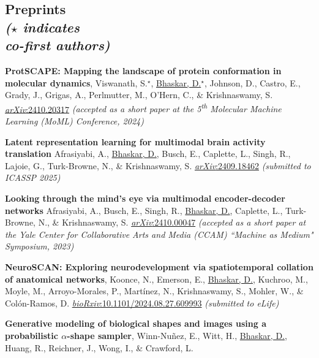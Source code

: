 \documentclass[margin,line]{res}
\begin{document}
\begin{resume}
\section{\sc Preprints\\ \textit{{\small ($\star$ indicates \\ co-first authors)}}}
{
\renewcommand\leftmargini{0em}
\renewcommand{\labelenumi}{P\theenumi}
\begin{etaremune}[start=8]
\item{\bf ProtSCAPE: Mapping the landscape of protein conformation in molecular dynamics},
Viswanath, S.$^\star$, \underline{Bhaskar, D.}$^\star$, Johnson, D., Castro, E., Grady, J., Grigas, A., Perlmutter, M., O'Hern, C., \& Krishnaswamy, S.
\href{https://arxiv.org/abs/2410.20317v1}{\textit{arXiv}:2410.20317}
\textit{(accepted as a short paper at the 5\textsuperscript{th} Molecular Machine Learning (MoML) Conference, 2024)}
\vspace*{.1cm}
\item{\bf Latent representation learning for multimodal brain activity translation}
Afrasiyabi, A., \underline{Bhaskar, D.}, Busch, E., Caplette, L., Singh, R., Lajoie, G., Turk-Browne, N., \& Krishnaswamy, S.
\href{https://arxiv.org/abs/2409.18462}{\textit{arXiv}:2409.18462}
\textit{(submitted to ICASSP 2025)}
\vspace*{.1cm}
\item{\bf Looking through the mind's eye via multimodal encoder-decoder networks}
Afrasiyabi, A., Busch, E., Singh, R., \underline{Bhaskar, D.}, Caplette, L., Turk-Browne, N., \& Krishnaswamy, S.
\href{https://arxiv.org/abs/2410.00047}{\textit{arXiv}:2410.00047} 
\textit{(accepted as a short paper at the Yale Center for Collaborative Arts and Media (CCAM) ``Machine as Medium" Symposium, 2023)}
\vspace*{.1cm}
\item{\bf NeuroSCAN: Exploring neurodevelopment via spatiotemporal collation of anatomical networks},
Koonce, N., Emerson, E., \underline{Bhaskar, D.}, Kuchroo, M., Moyle, M., Arroyo-Morales, P., Martínez, N., Krishnaswamy, S., Mohler, W., \& Colón-Ramos, D.
\href{https://doi.org/10.1101/2024.08.27.609993}{\textit{bioRxiv}:10.1101/2024.08.27.609993}
\textit{(submitted to eLife)}
\item{\bf Generative modeling of biological shapes and images using a probabilistic $\alpha$-shape sampler},
Winn-Nu\~{n}ez, E., Witt, H., \underline{Bhaskar, D.}, Huang, R., Reichner, J., Wong, I., \& Crawford, L.

\end{etaremune}}
\end{resume}
\end{document}
